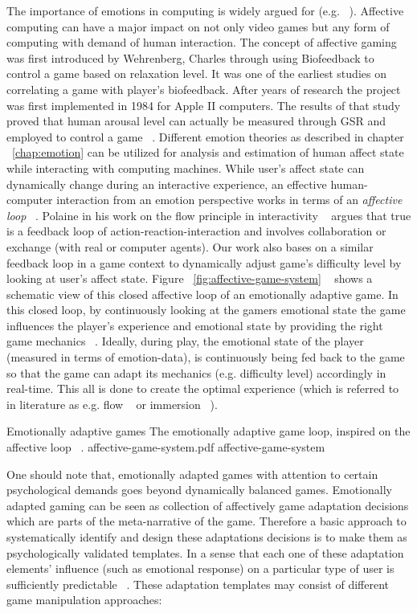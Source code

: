 The importance of emotions in computing is widely argued for (e.g. ~\cite{picard2003affective}). Affective computing can have a major impact on not only video games but any form of computing with demand of human interaction. The concept of affective gaming was first introduced by Wehrenberg, Charles through using Biofeedback to control a game based on relaxation level. It was one of the earliest studies on correlating a game with player's biofeedback. After years of research the project was first implemented in 1984 for Apple II computers. The results of that study proved that human arousal level can actually be measured through GSR and employed to control a game ~\cite{wehrenberg1995willball}. Different emotion theories as described in chapter ~\ref{chap:emotion} can be utilized for analysis and estimation of human affect state while interacting with computing machines. While user's affect state can dynamically change during an interactive experience, an effective human-computer interaction from an emotion perspective works in terms of an \textit{affective loop} ~\cite{sundstrom2005user}. Polaine in his work on the flow principle in interactivity ~\cite{polaine2005flow} argues that true is a feedback loop of action-reaction-interaction and involves collaboration or exchange (with real or computer agents). Our work also bases on a similar feedback loop in a game context to dynamically adjust game's difficulty level by looking at user's affect state. Figure ~\ref{fig:affective-game-system} ~\cite{tijs2009creating} shows a schematic view of this closed affective loop of an emotionally adaptive game. In this closed loop, by continuously looking at the gamers emotional state the game influences the player's experience and emotional state by providing the right game mechanics ~\cite{hunicke2004mda}. Ideally, during play, the emotional state of the player (measured in terms of emotion-data), is continuously being fed back to the game so that the game can adapt its mechanics (e.g. difficulty level) accordingly in real-time. This all is done to create the optimal experience (which is referred to in literature as e.g. flow ~\cite{chen2007flow} or immersion ~\cite{nacke2008flow}).

\img
{Emotionally adaptive games}
{The emotionally adaptive game loop, inspired on the affective loop ~\cite{sundstrom2005user}.}
{affective-game-system.pdf}
{affective-game-system}

One should note that, emotionally adapted games with attention to certain psychological demands goes beyond dynamically balanced games. Emotionally adapted gaming can be seen as collection of affectively game adaptation decisions which are parts of the meta-narrative of the game. Therefore a basic approach to systematically identify and design these adaptations decisions is to make them as psychologically validated templates. In a sense that each one of these adaptation elements' influence (such as emotional response) on a particular type of user is sufficiently predictable ~\cite{saari2009emotionally}. These adaptation templates may consist of different game manipulation approaches:

